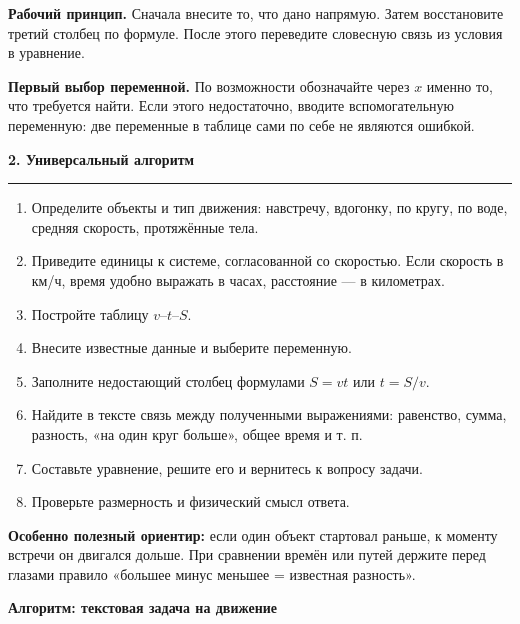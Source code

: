 \documentclass[a4paper,12pt]{article}
\newcommand{\sectiontitle}[1]{%
  \vspace{2mm}%
  {\Large\bfseries\color{darkaccent}#1}\par
  \vspace{1mm}\color{rulegray}\hrule\color{textgray}\vspace{3mm}%
}
\newcommand{\key}[1]{\textbf{\color{darkaccent}#1}}
\begin{document}
\key{Рабочий принцип.} Сначала внесите то, что дано напрямую. Затем восстановите третий столбец по формуле. После этого переведите словесную связь из условия в уравнение.

\key{Первый выбор переменной.} По возможности обозначайте через $x$ именно то, что требуется найти. Если этого недостаточно, вводите вспомогательную переменную: две переменные в таблице сами по себе не являются ошибкой.

\sectiontitle{2. Универсальный алгоритм}

\begin{enumerate}
  \item Определите объекты и тип движения: навстречу, вдогонку, по кругу, по воде, средняя скорость, протяжённые тела.
  \item Приведите единицы к системе, согласованной со скоростью. Если скорость в км/ч, время удобно выражать в часах, расстояние — в километрах.
  \item Постройте таблицу $v$--$t$--$S$.
  \item Внесите известные данные и выберите переменную.
  \item Заполните недостающий столбец формулами $S=vt$ или $t=S/v$.
  \item Найдите в тексте связь между полученными выражениями: равенство, сумма, разность, «на один круг больше», общее время и т. п.
  \item Составьте уравнение, решите его и вернитесь к вопросу задачи.
  \item Проверьте размерность и физический смысл ответа.
\end{enumerate}

\key{Особенно полезный ориентир:} если один объект стартовал раньше, к моменту встречи он двигался дольше. При сравнении времён или путей держите перед глазами правило «большее минус меньшее = известная разность».

\clearpage

\thispagestyle{plain}
\begin{center}
{\Large\bfseries\color{darkaccent}Алгоритм: текстовая задача на движение}
\end{center}
\vspace{6mm}
\end{document}
